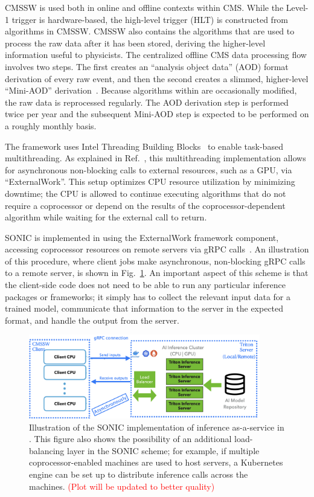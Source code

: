CMSSW is used both in online and offline contexts within CMS. While the Level-1 trigger is hardware-based, the high-level trigger (HLT) is constructed from algorithms in CMSSW. CMSSW also contains the algorithms that are used to process the raw data after it has been stored, deriving the higher-level information useful to physicists. The centralized offline CMS data processing flow involves two steps. The first creates an ``analysis object data'' (AOD) format derivation of every raw event, and then the second creates a slimmed, higher-level ``Mini-AOD'' derivation~\cite{Petrucciani:2015gjw}. Because algorithms within \CMSSW are occasionally modified, the raw data is reprocessed regularly. The AOD derivation step is performed twice per year and the subsequent Mini-AOD step is expected to be performed on a roughly monthly basis.

The \CMSSW framework uses Intel Threading Building Blocks~\cite{tbb} to enable task-based multithreading. As explained in Ref.~\cite{Bocci:2020olh}, this multithreading implementation allows for asynchronous non-blocking calls to external resources, such as a GPU, via ``ExternalWork''. This setup optimizes CPU resource utilization by minimizing downtime; the CPU is allowed to continue executing algorithms that do not require a coprocessor or depend on the results of the coprocessor-dependent algorithm while waiting for the external call to return.

SONIC is implemented in \CMSSW using the ExternalWork framework component, accessing coprocessor resources on remote servers via gRPC calls~\cite{gRPC}. An illustration of this procedure, where client jobs make asynchronous, non-blocking gRPC calls to a remote server, is shown in Fig.~\ref{fig:architecture}. An important aspect of this scheme is that the client-side code does not need to be able to run any particular inference packages or frameworks; it simply has to collect the relevant input data for a trained model, communicate that information to the server in the expected format, and handle the output from the server.

\begin{figure}[htp]
    \centering
    \includegraphics[width=0.90\textwidth]{plots/Architecture.png}
    \caption{Illustration of the SONIC implementation of inference as-a-service in \CMSSW. This figure also shows the possibility of an additional load-balancing layer in the SONIC scheme; for example, if multiple coprocessor-enabled machines are used to host servers, a Kubernetes engine can be set up to distribute inference calls across the machines. \textcolor{red}{(Plot will be updated to better quality)}}
    \label{fig:architecture}
\end{figure}

